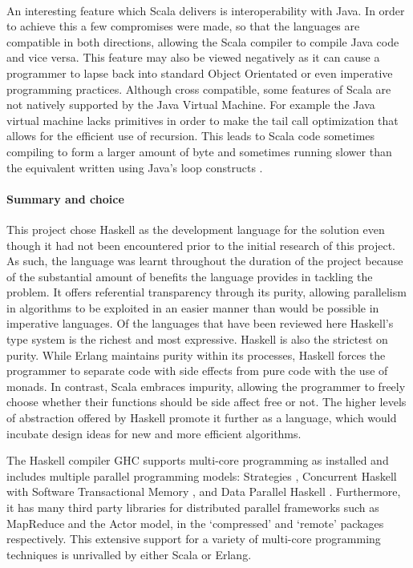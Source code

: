 \documentclass[main.tex]{subfiles}
\begin{document}
{{\paragraph{}An interesting feature which Scala delivers is interoperability with Java. In order to achieve this a few compromises were made\cite{Venners2009}, so that the languages are compatible in both directions, allowing the Scala compiler to compile Java code and vice versa. This feature may also be viewed negatively as it can cause a programmer to lapse back into standard Object Orientated or even imperative programming practices. Although cross compatible, some features of Scala are not natively supported by the Java Virtual Machine. For example the Java virtual machine lacks primitives in order to make the tail call optimization that allows for the efficient use of recursion. This leads to Scala code sometimes compiling to form a larger amount of byte and sometimes running slower than the equivalent written using Java's loop constructs \cite{Odersky2011}.

\paragraph{Summary and choice}
This project chose Haskell as the development language for the solution even though it had not been encountered prior to the initial research of this project. As such, the language was learnt throughout the duration of the project because of the substantial amount of benefits the language provides in tackling the problem. It offers referential transparency through its purity, allowing parallelism in algorithms to be exploited in an easier manner than would be possible in imperative languages. Of the languages that have been reviewed here Haskell's type system is the richest and most expressive. Haskell is also the strictest on purity. While Erlang maintains purity within its processes, Haskell forces the programmer to separate code with side effects from pure code with the use of monads. In contrast, Scala embraces impurity, allowing the programmer to freely choose whether their functions should be side affect free or not. The higher levels of abstraction offered by Haskell promote it further as a language, which would incubate design ideas for new and more efficient algorithms.

The Haskell compiler GHC supports multi-core programming as installed and includes multiple parallel programming models: Strategies \cite{Trinder1998}, Concurrent Haskell \cite{Jones1996} with Software Transactional Memory \cite{Harris2005}, and Data Parallel Haskell \cite{Chakravarty2007}. Furthermore, it has many third party libraries for distributed parallel frameworks such as MapReduce and the Actor model, in the `compressed' and `remote' packages respectively. This extensive support for a variety of multi-core programming techniques is unrivalled by either Scala or Erlang.

}}
\end{document}
